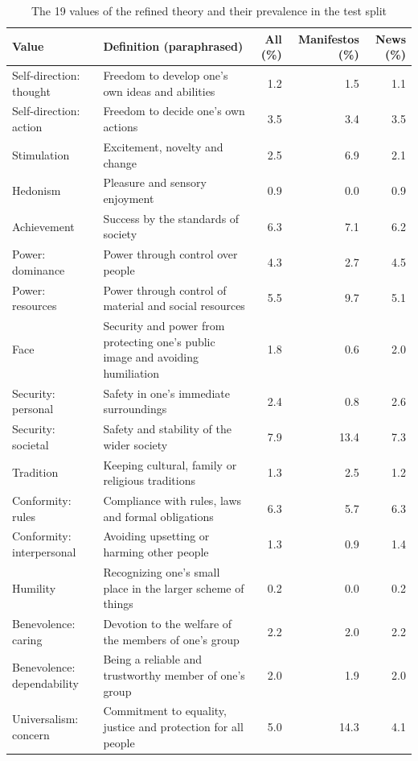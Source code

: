 \begin{table}[t]
\caption{The 19 values of the refined theory and their prevalence in the test split}
\label{tab:values}
\centering
\footnotesize
\begin{tabular*}{\textwidth}{@{\extracolsep{\fill}}lp{}rrr@{}}
\toprule
Value & Definition (paraphrased) & All (\%) & Manifestos (\%) & News (\%) \\
\midrule
Self-direction: thought & Freedom to develop one's own ideas and abilities & 1.2 & 1.5 & 1.1 \\
Self-direction: action & Freedom to decide one's own actions & 3.5 & 3.4 & 3.5 \\
Stimulation & Excitement, novelty and change & 2.5 & 6.9 & 2.1 \\
Hedonism & Pleasure and sensory enjoyment & 0.9 & 0.0 & 0.9 \\
Achievement & Success by the standards of society & 6.3 & 7.1 & 6.2 \\
Power: dominance & Power through control over people & 4.3 & 2.7 & 4.5 \\
Power: resources & Power through control of material and social resources & 5.5 & 9.7 & 5.1 \\
Face & Security and power from protecting one's public image and avoiding humiliation & 1.8 & 0.6 & 2.0 \\
Security: personal & Safety in one's immediate surroundings & 2.4 & 0.8 & 2.6 \\
Security: societal & Safety and stability of the wider society & 7.9 & 13.4 & 7.3 \\
Tradition & Keeping cultural, family or religious traditions & 1.3 & 2.5 & 1.2 \\
Conformity: rules & Compliance with rules, laws and formal obligations & 6.3 & 5.7 & 6.3 \\
Conformity: interpersonal & Avoiding upsetting or harming other people & 1.3 & 0.9 & 1.4 \\
Humility & Recognizing one's small place in the larger scheme of things & 0.2 & 0.0 & 0.2 \\
Benevolence: caring & Devotion to the welfare of the members of one's group & 2.2 & 2.0 & 2.2 \\
Benevolence: dependability & Being a reliable and trustworthy member of one's group & 2.0 & 1.9 & 2.0 \\
Universalism: concern & Commitment to equality, justice and protection for all people & 5.0 & 14.3 & 4.1 \\

\end{tabular*}
\end{table}

